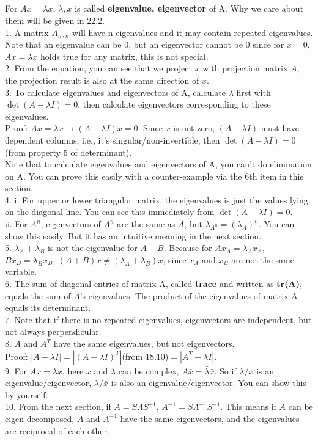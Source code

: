 \documentclass{article}
\begin{document}
\begin{spacing}{1.5}
\section{}
For $Ax=\lambda x$, $\lambda, x$ is called {\bfseries eigenvalue, eigenvector} of A. Why we care about them will be given in 22.2. \\
1. A matrix $A_{n\cdot n}$ will have n eigenvalues and it may contain repeated eigenvalues. Note that an eigenvalue can be 0, but an eigenvector cannot be 0 since for $x=0$, $Ax=\lambda x$ holds true for any matrix, this is not special. \\
2. From the equation, you can see that we project $x$ with projection matrix $A$, the projection result is also at the same direction of $x$. \\
3. To calculate eigenvalues and eigenvectors of A, calculate $\lambda$ first with $\det(A-\lambda I) = 0$, then calculate eigenvectors corresponding to these eigenvalues. \\ 
Proof: $Ax=\lambda x \rightarrow (A-\lambda I)x = 0 $. Since $x$ is not zero, $(A-\lambda I)$ must have dependent columns, i.e., it's singular/non-invertible, then $\det(A-\lambda I) = 0$(from property 5 of determinant). \\
Note that to calculate eigenvalues and eigenvectors of A, you can't do elimination on A. You can prove this easily with a counter-example via the 6th item in this section.\\
4. i. For upper or lower triangular matrix, the eigenvalues is just the values lying on the diagonal line. You can see this immediately from $\det(A-\lambda I) = 0$. \\
ii. For $A^n$, eigenvectors of $A^n$ are the same as $A$, but $\lambda_{A^n}=(\lambda_A)^n$. You can show this easily. But it has an intuitive meaning in the next section. \\
5. $\lambda_A + \lambda_B$ is not the eigenvalue for $A+B$. Because for $Ax_A=\lambda_Ax_A$, $Bx_B=\lambda_Bx_B$, $(A+B)x\neq(\lambda_A + \lambda_B)x$, since $x_A$ and $x_B$ are not the same variable. \\
6. The sum of diagonal entries of matrix A, called {\bfseries trace} and written as {\bfseries tr(A)}, equals the sum of $A$'s eigenvalues. The product of the eigenvalues of matrix A equals its determinant. \\
7. Note that if there is no repeated eigenvalues, eigenvectors are independent, but not always perpendicular. \\
8.  $A$ and $A^T$ have the same eigenvalues, but not eigenvectors. \\
Proof: $|A-\lambda I|=|(A-\lambda I)^T|$(from 18.10)$=|A^T-\lambda I|$. \\
9. For $Ax=\lambda x$, here $x$ and $\lambda$ can be complex, $A\bar x=\bar\lambda \bar x$. So if $\lambda/x$ is an eigenvalue/eigenvector, $\bar \lambda /\bar x$ is also an eigenvalue/eigenvector. You can show this by yourself. \\
10. From the next section, if $A=S\Lambda S^{-1}$, $A^{-1}=S\Lambda^{-1} S^{-1}$. This means if $A$ can be eigen decomposed, $A$ and $A^{-1}$ have the same eigenvectors, and the eigenvalues are reciprocal of each other.



\end{spacing}
\end{document}
